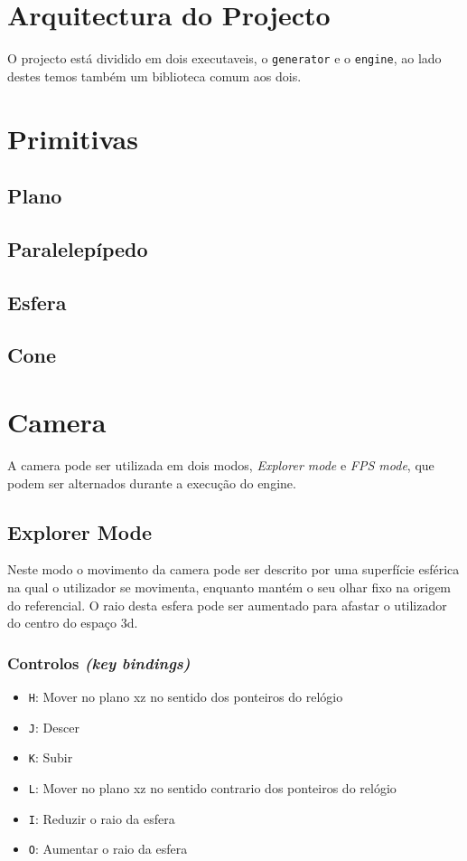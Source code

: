 \documentclass[a4paper]{article}
\begin{document}
\section{Arquitectura do Projecto}
O projecto está dividido em dois executaveis, o \texttt{generator} e o \texttt{engine}, ao lado destes temos também um biblioteca comum aos dois.

\section{Primitivas}
\subsection{Plano}

\subsection{Paralelepípedo}

\subsection{Esfera}

\subsection{Cone}

\section{Camera}
A camera pode ser utilizada em dois modos, \textit{Explorer mode} e \textit{FPS mode}, que podem ser alternados durante a execução do engine.

\subsection{Explorer Mode}

Neste modo o movimento da camera pode ser descrito por uma superfície esférica na qual o utilizador se movimenta, enquanto mantém o seu olhar fixo na origem do referencial. O raio desta esfera pode ser aumentado para afastar o utilizador do centro do espaço 3d.

\subsubsection{Controlos \textit{(key bindings)}}

\begin{itemize}
    \item \texttt{H}: Mover no plano xz no sentido dos ponteiros do relógio
    \item \texttt{J}: Descer
    \item \texttt{K}: Subir
    \item \texttt{L}: Mover no plano xz no sentido contrario dos ponteiros do relógio
    \item \texttt{I}: Reduzir o raio da esfera
    \item \texttt{O}: Aumentar o raio da esfera
\end{itemize}
\end{document}
